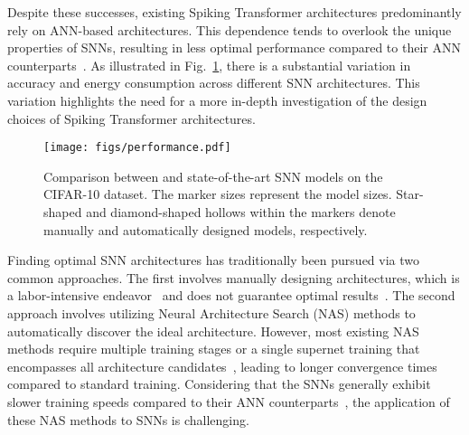 \documentclass{article}
\theoremstyle{plain}
\theoremstyle{definition}
\theoremstyle{remark}
\begin{document}
Despite these successes, existing Spiking Transformer architectures predominantly rely on ANN-based architectures. This dependence tends to overlook the unique properties of SNNs, resulting in less optimal performance compared to their ANN counterparts~\cite{kimNeuralArchitectureSearch2022, naAutoSNNEnergyefficientSpiking2022}. As illustrated in Fig.~\ref{fig: performance}, there is a substantial variation in accuracy and energy consumption across different SNN architectures. This variation highlights the need for a more in-depth investigation of the design choices of Spiking Transformer architectures. 

\begin{figure}[t]
\begin{center}
    \texttt{[image: figs/performance.pdf]}
\caption{Comparison between \sysname and state-of-the-art SNN models on the CIFAR-10 dataset. The marker sizes represent the model sizes. Star-shaped and diamond-shaped hollows within the markers denote manually and automatically designed models, respectively.}
\vskip -0.3in
\label{fig: performance}
\end{center}
\end{figure}

Finding optimal SNN architectures has traditionally been pursued via two common approaches. The first involves manually designing architectures, which is a labor-intensive endeavor~\cite{kimNeuralArchitectureSearch2022} and does not guarantee optimal results~\cite{zhouTrainingfreeTransformerArchitecture2022}. The second approach involves utilizing Neural Architecture Search (NAS) methods to automatically discover the ideal architecture. However, most existing NAS methods require multiple training stages or a single supernet training that encompasses all architecture candidates~\cite{caiProxylessnasDirectNeural2018}, leading to longer convergence times compared to standard training. Considering that the SNNs generally exhibit slower training speeds compared to their ANN counterparts~\cite{kimNeuralArchitectureSearch2022}, the application of these NAS methods to SNNs is challenging.
\end{document}
